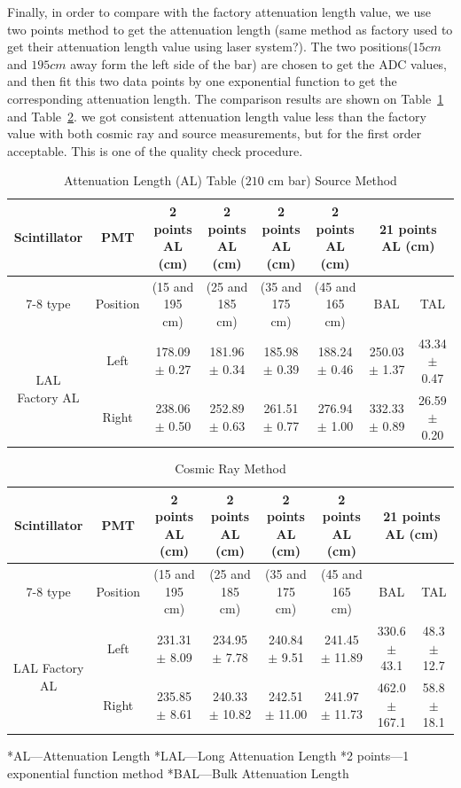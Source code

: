 Finally, in order to compare with the factory attenuation length value, we use two points method to get the attenuation length (same method as factory used to get their attenuation length value using laser system?). The two positions($15cm$ and $195cm$ away form the left side of the bar) are chosen to get the ADC values, and then fit this two data points by one exponential function to get the corresponding attenuation length. The comparison results are shown on Table~\ref{table2} and Table~\ref{table3}. we got consistent attenuation length value less than the factory value with both cosmic ray and source measurements, but for the first order acceptable. This is one of the quality check procedure.
\newpage
\begin{landscape}
\begin{table}[htbp]
\centering
\caption{Attenuation Length (AL) Table ($210$ cm bar) Source Method}
\begin{tabular}{|c|c|c|c|c|c|c|c|}
\hline
\multirow{2}{*}{Scintillator}
& \multirow{2}{*}{PMT}
& \multirow{2}{*}{2 points AL (cm)}
& \multirow{2}{*}{2 points AL (cm)}
& \multirow{2}{*}{2 points AL (cm)}
& \multirow{2}{*}{2 points AL (cm)}
& \multicolumn{2}{|c|}{21 points AL (cm)}\\
\cline{7-8}
type & Position & (15 and 195 cm) & (25 and 185 cm) & (35 and 175 cm) & (45 and 165 cm) & BAL & TAL \\
\hline
\multirow{2}{*}{LAL Factory AL}
& Left
& 178.09 $\pm$ 0.27
& 181.96 $\pm$ 0.34
& 185.98 $\pm$ 0.39
& 188.24 $\pm$ 0.46
& 250.03 $\pm$ 1.37
& 43.34 $\pm$ 0.47 \\
\cline{2-8}
(280cm) & Right & 238.06 $\pm$ 0.50 & 252.89 $\pm$ 0.63 & 261.51 $\pm$ 0.77
& 276.94 $\pm$ 1.00 & 332.33 $\pm$ 0.89 & 26.59 $\pm$ 0.20 \\
\hline
\end{tabular}
\label{table2}
\end{table}


\begin{table}[htbp]
\centering
\caption{Cosmic Ray Method}
\begin{tabular}{|c|c|c|c|c|c|c|c|}
\hline
\multirow{2}{*}{Scintillator}
& \multirow{2}{*}{PMT}
& \multirow{2}{*}{2 points AL (cm)}
& \multirow{2}{*}{2 points AL (cm)}
& \multirow{2}{*}{2 points AL (cm)}
& \multirow{2}{*}{2 points AL (cm)}
& \multicolumn{2}{|c|}{21 points AL (cm)}\\
\cline{7-8}
type & Position & (15 and 195 cm) & (25 and 185 cm) & (35 and 175 cm) & (45 and 165 cm) & BAL & TAL \\
\hline
\multirow{2}{*}{LAL Factory AL}
& Left
& 231.31 $\pm$ 8.09
& 234.95 $\pm$ 7.78
& 240.84 $\pm$ 9.51
& 241.45 $\pm$ 11.89
& 330.6 $\pm$ 43.1
& 48.3 $\pm$ 12.7 \\
\cline{2-8}
(280cm) & Right & 235.85 $\pm$ 8.61 & 240.33 $\pm$ 10.82 & 242.51 $\pm$ 11.00
& 241.97 $\pm$ 11.73 & 462.0 $\pm$ 167.1 & 58.8 $\pm$ 18.1 \\
\hline
\end{tabular}
\label{table3}
\end{table}

*AL---Attenuation Length                    *LAL---Long Attenuation Length
*2 points---1 exponential function method   *BAL---Bulk Attenuation Length
\end{landscape}

